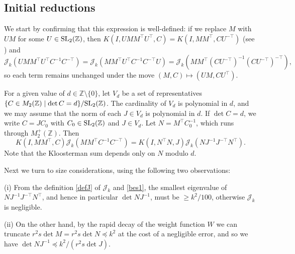\documentclass[11pt]{amsart}
\numberwithin{equation}{section}
\theoremstyle{plain}
\theoremstyle{definition}
\renewcommand{\geq}{\geqslant}
\numberwithin{equation}{section}
\begin{document}
\subsection{Initial reductions} 
We start by confirming that this expression is well-defined: if we replace $M$ with $UM$ for some $U \in {\rm SL}_2(\mathbb{Z})$, then $K(I, UMM^{\top}U^{\top}, C) = K(I, MM^{\top}, C U^{-\top})$ (see \cite[p.\ 153]{Ki}) and $$\mathcal{J}_k(UMM^{\top} U^{\top}C^{-1} C^{-\top}) = \mathcal{J}_k( MM^{\top} U^{\top}C^{-1} C^{-\top}U) = \mathcal{J}_k( MM^{\top} (CU^{-\top})^{-1} (CU^{-\top})^{-\top} ), $$
so each term remains unchanged under the move $(M, C) \mapsto (UM, CU^{\top})$.  


For a given value of $d \in \mathbb{Z}\setminus \{0\}$, let $V_d$ be a set of representatives $\{C \in M_2(\mathbb{Z}) \mid \det C = d\}/{\rm SL}_2(\mathbb{Z})$. The cardinality of $V_d$ is polynomial in $d$, and we may assume that the norm of each $J \in V_d$ is polynomial in $d$. If $\det C = d$, we write $C = JC_0$ with $C_0\in {\rm SL}_2(\mathbb{Z})$ and $J \in V_d$.  Let $N = M^{\top}C_0^{-1}$, which runs through $M^+_2(\mathbb{Z})$. Then
$$K(I, MM^{\top}, C)\mathcal{J}_k(MM^{\top} C^{-1} C^{-\top}) = K(I, N^{\top}N, J)\mathcal{J}_k( N J^{-1}J^{-\top} N^{\top}). $$
Note that the Kloosterman sum depends only on $N$ modulo $d$. 

Next we turn to size considerations, using the following two observations: 

(i) From the definition \eqref{defJ} of $\mathcal{J}_k$ and \eqref{bes1},   the smallest eigenvalue of $NJ^{-1}J^{-\top}N^{\top}$, and hence in particular $ \det NJ^{-1}$, must be $\geq k^2/100$, otherwise $\mathcal{J}_k$ is negligible.  

(ii) On the other hand, by the rapid decay of the weight function $W$ we can truncate $r^2 s  \det M = r^2 s \det N  \preccurlyeq k^2$ at the cost of a negligible error, and so we have $\det NJ^{-1} \preccurlyeq k^2/(r^2 s\det J)$. 
\end{document}
